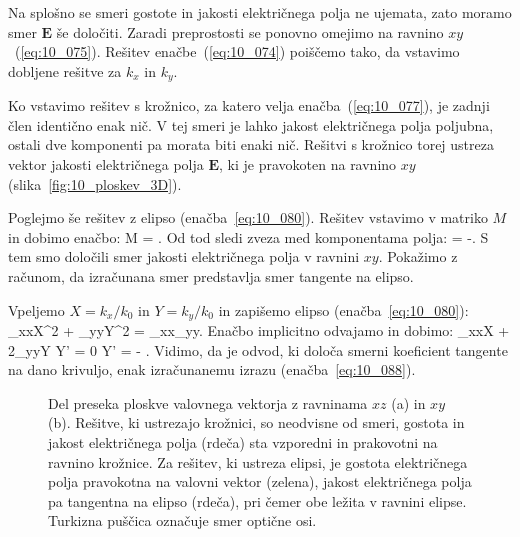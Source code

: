 Na splošno se smeri gostote in jakosti električnega polja ne ujemata, zato moramo smer $\mathbf{E}$
še določiti. Zaradi preprostosti se ponovno omejimo na ravnino $xy$~(\ref{eq:10_075}). Rešitev 
enačbe~(\ref{eq:10_074}) poiščemo tako, da vstavimo dobljene rešitve za $k_x$ in $k_y$.

Ko vstavimo rešitev s krožnico, za katero velja enačba~(\ref{eq:10_077}), je zadnji člen identično 
enak nič. V tej smeri je lahko jakost električnega polja poljubna, ostali dve komponenti pa morata
biti enaki nič. Rešitvi s krožnico torej ustreza vektor jakosti električnega polja $\mathbf{E}$, ki
je pravokoten na ravnino $xy$ (slika~\ref{fig:10_ploskev_3D}).

Poglejmo še rešitev z elipso (enačba~\ref{eq:10_080}). Rešitev vstavimo v matriko $M$ in dobimo
enačbo:
\beq
M \cdot {}=  \cdot
{}.
\label{eq:10_087}
\eeq
Od tod sledi zveza med komponentama polja:
\beq
{} = -.
\label{eq:10_088}
\eeq
S tem smo določili smer jakosti električnega polja v ravnini $xy$. Pokažimo z računom,
da izračunana smer predstavlja smer tangente na elipso. 

Vpeljemo $X = k_x/k_0$ in $Y = k_y/k_0$
in zapišemo elipso (enačba~\ref{eq:10_080}):
\beq
\varepsilon_{xx}X^2 + \varepsilon_{yy}Y^2 = \varepsilon_{xx}\varepsilon_{yy}.
\label{eq:10_089}
\eeq
Enačbo implicitno odvajamo in dobimo:
\varepsilon_{xx}X + 2\varepsilon_{yy}Y Y' = 0 \qquad \Longrightarrow \qquad 
Y' = -  .
\label{eq:10_090}
\eeq
Vidimo, da je odvod, ki določa smerni koeficient tangente na dano krivuljo, enak
izračunanemu izrazu (enačba~\ref{eq:10_088}).
\begin{figure}[h]
\centering
\def\svgwidth{130truemm} 

\caption{Del preseka ploskve valovnega vektorja z ravninama $xz$ (a) in $xy$ (b). 
Rešitve, ki ustrezajo krožnici, so neodvisne od smeri, gostota in jakost 
električnega polja (rdeča) sta vzporedni in prakovotni na ravnino krožnice. 
Za rešitev, ki ustreza elipsi, je gostota električnega polja pravokotna 
na valovni vektor (zelena), jakost električnega polja pa tangentna 
na elipso (rdeča), pri čemer obe ležita v ravnini elipse.
Turkizna puščica označuje smer optične osi.}
\label{fig:10_ploskev_tangenta}
\end{figure}

